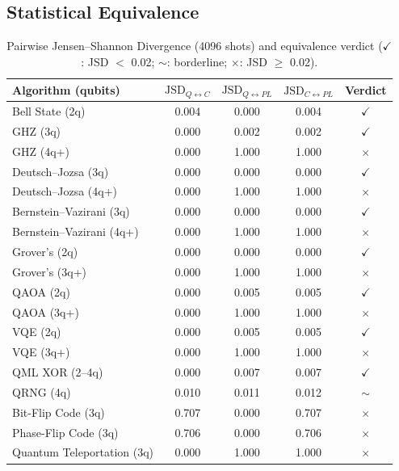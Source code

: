 \subsection{Statistical Equivalence}

\begin{table}[t]
\caption{Pairwise Jensen--Shannon Divergence (4096 shots) and
  equivalence verdict ($\checkmark$: JSD $<$ 0.02;
  $\sim$: borderline; $\times$: JSD $\geq$ 0.02).}
\label{tab:jsd}
\centering
\begin{tabular}{lcccc}
\toprule
\textbf{Algorithm (qubits)} &
  $\text{JSD}_{Q{\leftrightarrow}C}$ &
  $\text{JSD}_{Q{\leftrightarrow}PL}$ &
  $\text{JSD}_{C{\leftrightarrow}PL}$ &
  \textbf{Verdict} \\
\midrule
Bell State (2q)            & 0.004 & 0.000 & 0.004 & $\checkmark$ \\
GHZ (3q)                   & 0.000 & 0.002 & 0.002 & $\checkmark$ \\
GHZ (4q+)                  & 0.000 & 1.000 & 1.000 & $\times$     \\
Deutsch--Jozsa (3q)        & 0.000 & 0.000 & 0.000 & $\checkmark$ \\
Deutsch--Jozsa (4q+)       & 0.000 & 1.000 & 1.000 & $\times$     \\
Bernstein--Vazirani (3q)   & 0.000 & 0.000 & 0.000 & $\checkmark$ \\
Bernstein--Vazirani (4q+)  & 0.000 & 1.000 & 1.000 & $\times$     \\
Grover's (2q)              & 0.000 & 0.000 & 0.000 & $\checkmark$ \\
Grover's (3q+)             & 0.000 & 1.000 & 1.000 & $\times$     \\
QAOA (2q)                  & 0.000 & 0.005 & 0.005 & $\checkmark$ \\
QAOA (3q+)                 & 0.000 & 1.000 & 1.000 & $\times$     \\
VQE (2q)                   & 0.000 & 0.005 & 0.005 & $\checkmark$ \\
VQE (3q+)                  & 0.000 & 1.000 & 1.000 & $\times$     \\
QML XOR (2--4q)            & 0.000 & 0.007 & 0.007 & $\checkmark$ \\
QRNG (4q)                  & 0.010 & 0.011 & 0.012 & $\sim$       \\
Bit-Flip Code (3q)         & 0.707 & 0.000 & 0.707 & $\times$     \\
Phase-Flip Code (3q)       & 0.706 & 0.000 & 0.706 & $\times$     \\
Quantum Teleportation (3q) & 0.000 & 1.000 & 1.000 & $\times$     \\
\bottomrule
\end{tabular}
\end{table}


